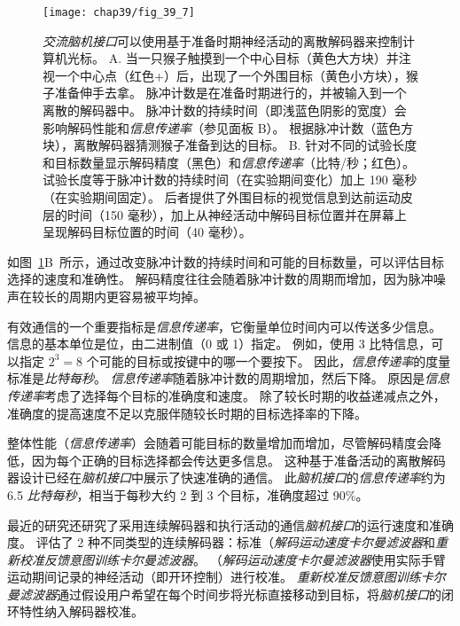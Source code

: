 \begin{figure}[htbp]
	\centering
	\texttt{[image: chap39/fig\_39\_7]}
	\caption{\textit{交流脑机接口}可以使用基于准备时期神经活动的离散解码器来控制计算机光标。 
		A. 当一只猴子触摸到一个中心目标（黄色大方块）并注视一个中心点（红色+）后，出现了一个外围目标（黄色小方块），猴子准备伸手去拿。 
		脉冲计数是在准备时期进行的，并被输入到一个离散的解码器中。 
		脉冲计数的持续时间（即浅蓝色阴影的宽度）会影响解码性能和\textit{信息传递率}（参见面板 B）。 
		根据脉冲计数（蓝色方块），离散解码器猜测猴子准备到达的目标。 
		B. 针对不同的试验长度和目标数量显示解码精度（黑色）和\textit{信息传递率}（比特/秒；红色）。 
		试验长度等于脉冲计数的持续时间（在实验期间变化）加上 190 毫秒（在实验期间固定）。 
		后者提供了外围目标的视觉信息到达前运动皮层的时间（150 毫秒），加上从神经活动中解码目标位置并在屏幕上呈现解码目标位置的时间（40 毫秒）\cite{santhanam2006high}。}
	\label{fig:39_7}
\end{figure}


如图~\ref{fig:39_7}B~所示，通过改变脉冲计数的持续时间和可能的目标数量，可以评估目标选择的速度和准确性。
解码精度往往会随着脉冲计数的周期而增加，因为脉冲噪声在较长的周期内更容易被平均掉。


有效通信的一个重要指标是\textit{信息传递率}，它衡量单位时间内可以传送多少信息。
信息的基本单位是位，由二进制值（0 或 1）指定。
例如，使用 3 比特信息，可以指定 $2^3=8$ 个可能的目标或按键中的哪一个要按下。
因此，\textit{信息传递率}的度量标准是\textit{比特每秒}。
\textit{信息传递率}随着脉冲计数的周期增加，然后下降。
原因是\textit{信息传递率}考虑了选择每个目标的准确度和速度。
除了较长时期的收益递减点之外，准确度的提高速度不足以克服伴随较长时期的目标选择率的下降。


整体性能（\textit{信息传递率}）会随着可能目标的数量增加而增加，尽管解码精度会降低，因为每个正确的目标选择都会传达更多信息。
这种基于准备活动的离散解码器设计已经在\textit{脑机接口}中展示了快速准确的通信。
此\textit{脑机接口}的\textit{信息传递率}约为 6.5 \textit{比特每秒}，相当于每秒大约 2 到 3 个目标，准确度超过 90\%。


最近的研究还研究了采用连续解码器和执行活动的通信\textit{脑机接口}的运行速度和准确度。
评估了 2 种不同类型的连续解码器：标准（\textit{解码运动速度卡尔曼滤波器}和\textit{重新校准反馈意图训练卡尔曼滤波器}。
（\textit{解码运动速度卡尔曼滤波器}使用实际手臂运动期间记录的神经活动（即开环控制）进行校准。
\textit{重新校准反馈意图训练卡尔曼滤波器}通过假设用户希望在每个时间步将光标直接移动到目标，将\textit{脑机接口}的闭环特性纳入解码器校准。


